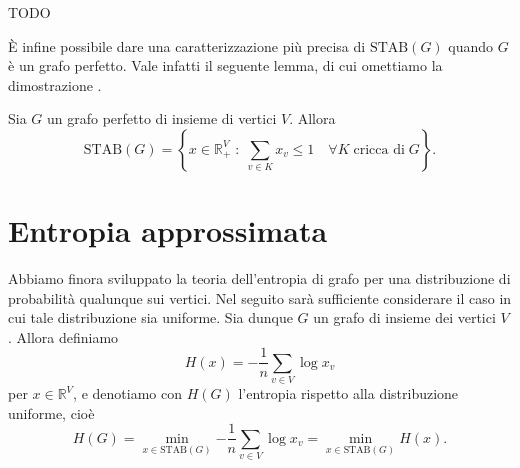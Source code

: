 TODO


È infine possibile dare una caratterizzazione più precisa di \(\text{STAB}(G)\) quando \(G\) è un grafo perfetto. Vale infatti il seguente lemma, di cui omettiamo la dimostrazione \cite{Chvatal1975}.

\begin{lemma}
	[Chvatál] \label{chvatallemma} Sia \(G\) un grafo perfetto di insieme di vertici \(V\). Allora
	\[
	  \text{STAB}(G) = \left\{x\in \mathbb{R}_{+}^V\;:\;\sum_{v\in K}{x_v}\le 1\quad \forall K\;\text{cricca di}\;G\right\}\text{.}
	\]
\end{lemma}

\section{Entropia approssimata}

Abbiamo finora sviluppato la teoria dell'entropia di grafo per una distribuzione di probabilità qualunque sui vertici. Nel seguito sarà sufficiente considerare il caso in cui tale distribuzione sia uniforme. Sia dunque \(G\) un grafo di insieme dei vertici \(V\). Allora definiamo
\[
  H(x) = -\frac{1}{n}\sum_{v\in V}{\log{x_v}}
\]
per \(x\in\mathbb{R}^V\), e denotiamo con \(H(G)\) l'entropia rispetto alla distribuzione uniforme, cioè
\[
  H(G) = \min_{x\in \text{STAB}(G)}{-\frac{1}{n}\sum_{v\in V}{\log{x_v}}} = \min_{x\in \text{STAB}(G)}{H(x)}\text{.}
\]

